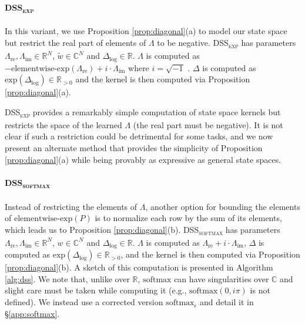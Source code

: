 \paragraph{\textsc{DSS}\textsubscript{\textsc{exp}} } In this variant, we use Proposition \ref{prop:diagonal}(a) to model our state space but restrict the real part of elements of $\Lambda$ to be negative. \textsc{DSS}\textsubscript{\textsc{exp}}  has parameters $\Lambda_\mathrm{re}, \Lambda_\mathrm{im} \in \mathbb{R}^N$, $\widetilde{w} \in \mathbb{C}^N$ and $\Delta_{\log} \in \mathbb{R}$. $\Lambda$ is computed as $-\mathrm{elementwise}\text{-}\mathrm{exp}(\Lambda_\mathrm{re}) + i\cdot \Lambda_\mathrm{im}$ where $i = \sqrt{-1}$ \cite{goel2022sashimi}. $\Delta$ is computed as $\mathrm{exp}(\Delta_{\log}) \in \mathbb{R}_{> 0}$ and the kernel is then computed via Proposition \ref{prop:diagonal}(a). 

\textsc{DSS}\textsubscript{\textsc{exp}}  provides a remarkably simple computation of state space kernels but restricts the space of the learned $\Lambda$ (the real part must be negative). It is not clear if such a restriction could be detrimental for some tasks, and we now present an alternate method that provides the simplicity of Proposition \ref{prop:diagonal}(a) while being provably as expressive as general state spaces.

\paragraph{\textsc{DSS}\textsubscript{\textsc{softmax}} } Instead of restricting the elements of $\Lambda$, another option for bounding the elements of $\mathrm{elementwise}\text{-}\mathrm{exp}(P)$ is to normalize each row by the sum of its elements, which leads us to Proposition \ref{prop:diagonal}(b). \textsc{DSS}\textsubscript{\textsc{softmax}}  has parameters $\Lambda_\mathrm{re}, \Lambda_\mathrm{im} \in \mathbb{R}^N$, $w \in \mathbb{C}^N$ and $\Delta_{\log} \in \mathbb{R}$. $\Lambda$ is computed as $\Lambda_\mathrm{re} + i\cdot \Lambda_\mathrm{im}$, $\Delta$ is computed as $\mathrm{exp}(\Delta_{\log}) \in \mathbb{R}_{> 0}$, and the kernel is then computed via Proposition \ref{prop:diagonal}(b). A sketch of this computation is presented in Algorithm \ref{alg:dss}. We note that, unlike over $\mathbb{R}$, $\mathrm{softmax}$ can have singularities over $\mathbb{C}$ and slight care must be taken while computing it (e.g., $\mathrm{softmax}(0,i\pi)$ is not defined). We instead use a corrected version $\mathrm{softmax}_{\epsilon}$ and detail it in \S\ref{app:softmax}.

